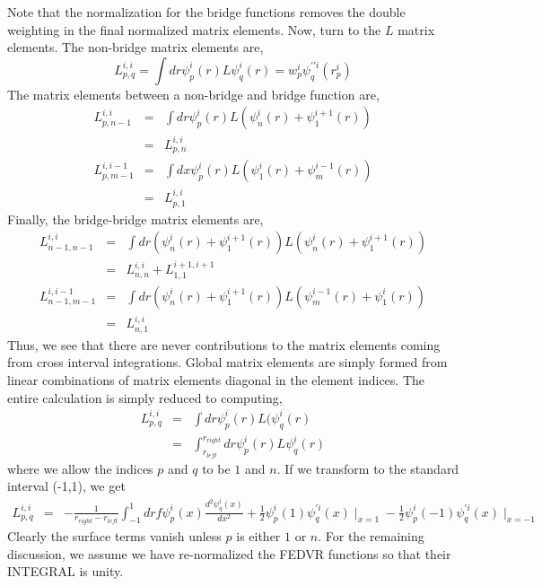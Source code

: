 \documentclass[preprint,showpacs,preprintnumbers,amsmath,amssymb]{revtex4}
\begin{document}
Note that the normalization for the bridge functions removes the double
weighting in the final normalized matrix elements.
Now, turn to the $L$ matrix elements. The non-bridge matrix elements are,
\begin{equation}
    L^{i,i}_{p,q} = \int dr \psi^{i}_{p}(r) L \psi^{i}_{q}(r)
                = w^{i}_{p} \psi^{ \prime \prime i }_{q}(r^{i}_{p})
\end{equation}
The matrix elements between a non-bridge and bridge function are,
\begin{eqnarray}
    L^{i,i}_{p,n-1} &=& \int dr \psi^{i}_{p}(r) L 
                      ( \psi^{i}_{n}(r) + \psi^{i+1}_{1}(r) ) \\ \nonumber
                &=& L^{i,i}_{p,n} \\ \nonumber
    L^{i,i-1}_{p,m-1} &=& \int dx \psi^{i}_{p}(r) L 
                      ( \psi^{i}_{1}(r) + \psi^{i-1}_{m}(r) ) \\ \nonumber
                &=& L^{i,i}_{p,1} 
\end{eqnarray}
Finally, the bridge-bridge matrix elements are,
\begin{eqnarray}
    L^{i,i}_{n-1,n-1} &=& \int dr ( \psi^{i}_{n}(r) + \psi^{i+1}_{1}(r) ) L 
                      ( \psi^{i}_{n}(r) + \psi^{i+1}_{1}(r) ) \\ \nonumber
            &=& L^{i,i}_{n,n} + L^{i+1,i+1}_{1,1} \\ \nonumber
    L^{i,i-1}_{n-1,m-1} &=& \int dr ( \psi^{i}_{n}(r) + \psi^{i+1}_{1}(r) )
                    L ( \psi^{i-1}_{m}(r) + \psi^{i}_{1}(r) ) \\ \nonumber
            &=& L^{i,i}_{n,1} 
\end{eqnarray}
Thus, we see that there are never contributions to the matrix elements
coming from cross interval integrations.  Global matrix elements are
simply formed from linear combinations of matrix elements diagonal in the
element indices.  The entire calculation is simply reduced to computing,
\begin{eqnarray}
    L^{i,i}_{p,q} &=& \int dr \psi^{i}_{p}(r) L ( \psi^{i}_{q}(r) 
                                        \\ \nonumber
       &=& \int_{r_{left}}^{r_{right}} dr \psi^{i}_{p}(r) L \psi^{i}_{q}(r)
\end{eqnarray}
where we allow the indices $p$ and $q$ to be $1$ and $n$.
If we transform to the standard interval (-1,1), we get
\begin{eqnarray}
   L^{i,i}_{p,q} &=& - \frac{1}{r_{right} - r_{left} }
     \int_{-1}^{1} dr f\psi^{i}_{p}(x) \frac{ d^2 \psi^{i}_{q}(x)} {dx^2} 
         + \frac{1}{2} \psi^{i}_{p}(1) \psi^{\prime i}_{q}(x) \mid_{x=1}  
         - \frac{1}{2} \psi^{i}_{p}(-1) \psi^{\prime i}_{q}(x) \mid_{x=-1}  
\end{eqnarray}
Clearly the surface terms vanish unless $p$ is either $1$ or $n$. 
For the remaining discussion, we assume we have re-normalized
the FEDVR functions so that their INTEGRAL is unity.
\end{document}
